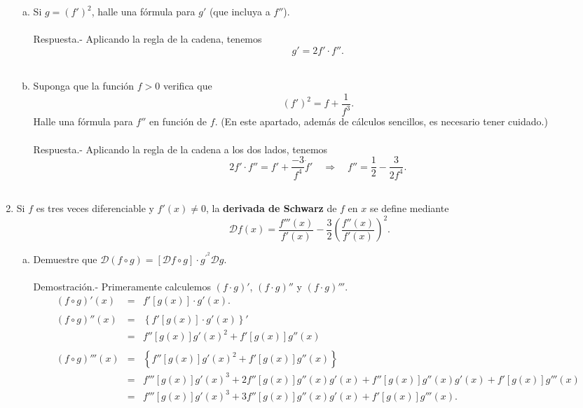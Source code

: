 \begin{enumerate}[\bfseries 1.]
\begin{enumerate}[(a)]
	     \item Si $g=\left(f'\right)^2$, halle una fórmula para $g'$ (que incluya a $f''$).\\\\
		 Respuesta.-  Aplicando la regla de la cadena, tenemos
		 $$g'=2f'\cdot f''.$$\\

	     \item Suponga que la función $f>0$ verifica que 
	     $$\left(f'\right)^2=f+\dfrac{1}{f^3}.$$
	     Halle una fórmula para $f''$ en función de $f$. (En este apartado, además de cálculos sencillos, es necesario tener cuidado.)\\\\
		 Respuesta.- Aplicando la regla de la cadena a los dos lados, tenemos
		 $$2f'\cdot f''=f'+\dfrac{-3}{f^4}\dot f' \quad \Rightarrow \quad f''=\dfrac{1}{2}-\dfrac{3}{2f^4}.$$\\
		 
	 \end{enumerate}

     \item Si $f$ es tres veces diferenciable y $f'(x)\neq 0$, la \textbf{derivada de Schwarz} de $f$ en $x$ se define mediante 
	 $$\mathscr{D}f(x)=\dfrac{f'''(x)}{f'(x)}-\dfrac{3}{2}\left(\dfrac{f''(x)}{f'(x)}\right)^2.$$

	 \begin{enumerate}[(a)]

	     \item Demuestre que $\mathscr{D}(f\circ g)=\left[\mathscr{D}f\circ g\right]\cdot g^{'^2}\mathscr{D}g.$\\\\
		 Demostración.-\; Primeramente calculemos $(f\cdot g)'$, $(f\cdot g)''$ y $(f\cdot g)'''$.
		 $$\begin{array}{rcl}
		     (f\circ g)'(x)&=&f'\left[g(x)\right]\cdot g'(x).\\\\
		     (f\circ g)''(x)&=&\left\{f'\left[g(x)\right]\cdot g'(x)\right\}'\\
				    &=&f''\left[g(x)\right]g'(x)^2+f'\left[g(x)\right]g''(x)\\\\
		     (f\circ g)'''(x)&=&\left\{f''\left[g(x)\right]g'(x)^2+f'\left[g(x)\right]g''(x)\right\}\\
				     &=&f'''\left[g(x)\right]g'(x)^3 + 2f''\left[g(x)\right]g''(x)g'(x)+f''\left[g(x)\right]g''(x)g'(x)+f'\left[g(x)\right]g'''(x)\\
				     &=&f'''\left[g(x)\right]g'(x)^3+3f''\left[g(x)\right]g''(x)g'(x)+f'\left[g(x)\right]g'''(x).\\
		 \end{array}$$


\end{enumerate}
\end{enumerate}
